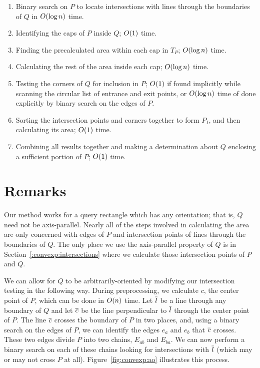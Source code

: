 \begin{enumerate}
 \item Binary search on $P$ to locate intersections with lines through the boundaries of $Q$ in $O\!\left(\log{n}\right)$ time.
 
 \item Identifying the caps of $P$ inside $Q$; $O\!\left(1\right)$ time.

 \item Finding the precalculated area within each cap in $T_P$; $O\!\left(\log{n}\right)$ time.

 \item Calculating the rest of the area inside each cap; $O\!\left(\log{n}\right)$ time.

 \item Testing the corners of $Q$ for inclusion in $P$; $O\!\left(1\right)$ if found implicitly while scanning the circular list of entrance and exit points, or $O\!\left(\log{n}\right)$ time of done explicitly by binary search on the edges of $P$.
 
 \item Sorting the intersection points and corners together to form $P_I$, and then calculating its area; $O\!\left(1\right)$ time.
 
 \item Combining all results together and making a determination about $Q$ enclosing a sufficient portion of $P$; $O\!\left(1\right)$ time.
 
\end{enumerate}


\section{Remarks}
\label{:convexp:remarks}

Our method works for a query rectangle which has any orientation; that is, $Q$ need not be axis-parallel. Nearly all of the steps involved in calculating the area are only concerned with edges of $P$ and intersection points of lines through the boundaries of $Q$. The only place we use the axis-parallel property of $Q$ is in Section~\ref{:convexp:intersections} where we calculate those intersection points of $P$ and $Q$.

We can allow for $Q$ to be arbitrarily-oriented by modifying our intersection testing in the following way.  During preprocessing, we calculate $c$, the center point of $P$, which can be done in $O\!\left(n\right)$ time. Let $\overline{l}$ be a line through any boundary of $Q$ and let $\overline{c}$ be the line perpendicular to $\overline{l}$ through the center point of $P$.  The line $\overline{c}$ crosses the boundary of $P$ in two places, and, using a binary search on the edges of $P$, we can identify the edges $e_a$ and $e_b$ that $\overline{c}$ crosses. These two edges divide $P$ into two chains, $E_{ab}$ and $E_{ba}$. We can now perform a binary search on each of these chains looking for intersections with $\overline{l}$ (which may or may not cross $P$ at all). Figure~\ref{fig:convexp:ao} illustrates this process.

